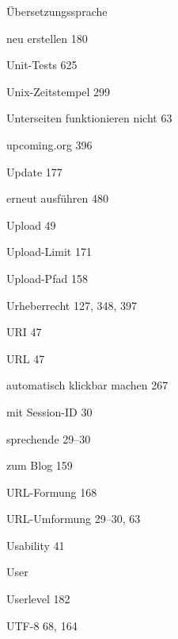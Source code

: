 \documentclass{book}
\renewcommand\subitem{\par}
\begin{document}
\begin{multicols}{2}
\begin{osp-index}
  \item \"Ubersetzungssprache
    \subitem neu erstellen\hspace{1mm} 180
  \item Unit-Tests\hspace{1mm} 625
  \item Unix-Zeitstempel\hspace{1mm} 299
  \item Unterseiten funktionieren nicht\hspace{1mm} 63
  \item upcoming.org\hspace{1mm} 396
  \item Update\hspace{1mm} 177
    \subitem erneut ausf\"uhren\hspace{1mm} 480
  \item Upload\hspace{1mm} 49
  \item Upload-Limit\hspace{1mm} 171
  \item Upload-Pfad\hspace{1mm} 158
  \item Urheberrecht\hspace{1mm} 127, 348, 397
  \item URI\hspace{1mm} 47
  \item URL\hspace{1mm} 47
    \subitem automatisch klickbar machen\hspace{1mm} 267
    \subitem mit Session-ID\hspace{1mm} 30
    \subitem sprechende\hspace{1mm} 29--30
    \subitem zum Blog\hspace{1mm} 159
  \item URL-Formung\hspace{1mm} 168
  \item URL-Umformung\hspace{1mm} 29--30, 63
  \item Usability\hspace{1mm} 41
  \item User\hspace{1mm} 
  \item Userlevel\hspace{1mm} 182
  \item UTF-8\hspace{1mm} 68, 164


\end{osp-index}
\end{multicols}
\end{document}
